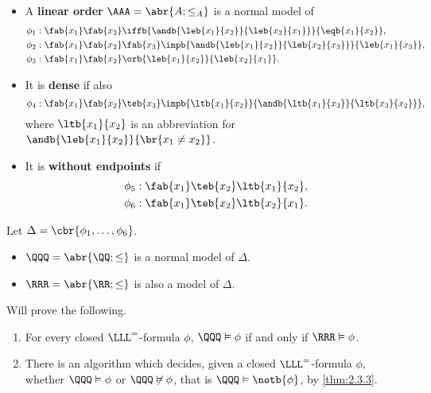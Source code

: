 \begin{definition}
\hfill
\begin{itemize}
\item A \textbf{linear order} $ \AAA = \abr{A; \le_A} $ is a normal model of
\begin{align*}
\phi_1 & : \fab{x_1}\fab{x_2}\iffb{\andb{\leb{x_1}{x_2}}{\leb{x_2}{x_1}}}{\eqb{x_1}{x_2}}, \\
\phi_2 & : \fab{x_1}\fab{x_2}\fab{x_3}\impb{\andb{\leb{x_1}{x_2}}{\leb{x_2}{x_3}}}{\leb{x_1}{x_3}}, \\
\phi_3 & : \fab{x_1}\fab{x_2}\orb{\leb{x_1}{x_2}}{\leb{x_2}{x_1}}.
\end{align*}
\item It is \textbf{dense} if also
$$ \phi_4 : \fab{x_1}\fab{x_2}\teb{x_3}\impb{\ltb{x_1}{x_2}}{\andb{\ltb{x_1}{x_3}}{\ltb{x_3}{x_2}}}, $$
where $ \ltb{x_1}{x_2} $ is an abbreviation for $ \andb{\leb{x_1}{x_2}}{\br{x_1 \ne x_2}} $.
\item It is \textbf{without endpoints} if
\begin{align*}
\phi_5 & : \fab{x_1}\teb{x_2}\ltb{x_1}{x_2}, \\
\phi_6 & : \fab{x_1}\teb{x_2}\ltb{x_2}{x_1}.
\end{align*}
\end{itemize}
\end{definition}

\pagebreak

Let $ \Delta = \cbr{\phi_1, \dots, \phi_6} $.
\begin{itemize}
\item $ \QQQ = \abr{\QQ; \le} $ is a normal model of $ \Delta $.
\item $ \RRR = \abr{\RR; \le} $ is also a model of $ \Delta $.
\end{itemize}
Will prove the following.

\begin{theorem}
\label{thm:2.7.2}
\hfill
\begin{enumerate}
\item For every closed $ \LLL^= $-formula $ \phi $, $ \QQQ \vDash \phi $ if and only if $ \RRR \vDash \phi $.
\item There is an algorithm which decides, given a closed $ \LLL^= $-formula $ \phi $, whether $ \QQQ \vDash \phi $ or $ \QQQ \not\vDash \phi $, that is $ \QQQ \vDash \notb{\phi} $, by \ref{thm:2.3.3}.
\end{enumerate}
\end{theorem}

